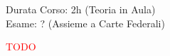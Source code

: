 \documentclass[../uefaC.tex]{subfiles}
\begin{document}
\onlyinsubfile{\maketitle}

\onlyinsubfile{}

\onlyinsubfile{\tableofcontents}


Durata Corso: 2h (Teoria in Aula) \hfill \\
Esame: ? (Assieme a Carte Federali)

\textcolor{red}{TODO}
\end{document}
